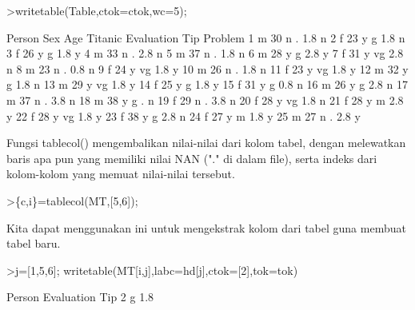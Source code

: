 \documentclass{article}
\newenvironment{eulernotebook}{\par}{\par}
\newenvironment{eulercomment}{\par\medskip}{\par\medskip}
\begin{document}
\begin{eulernotebook}
\begin{eulerprompt}
>writetable(Table,ctok=ctok,wc=5);
\end{eulerprompt}
\begin{euleroutput}
   Person  Sex  Age Titanic Evaluation  Tip Problem
        1    m   30       n          .  1.8       n
        2    f   23       y          g  1.8       n
        3    f   26       y          g  1.8       y
        4    m   33       n          .  2.8       n
        5    m   37       n          .  1.8       n
        6    m   28       y          g  2.8       y
        7    f   31       y         vg  2.8       n
        8    m   23       n          .  0.8       n
        9    f   24       y         vg  1.8       y
       10    m   26       n          .  1.8       n
       11    f   23       y         vg  1.8       y
       12    m   32       y          g  1.8       n
       13    m   29       y         vg  1.8       y
       14    f   25       y          g  1.8       y
       15    f   31       y          g  0.8       n
       16    m   26       y          g  2.8       n
       17    m   37       n          .  3.8       n
       18    m   38       y          g    .       n
       19    f   29       n          .  3.8       n
       20    f   28       y         vg  1.8       n
       21    f   28       y          m  2.8       y
       22    f   28       y         vg  1.8       y
       23    f   38       y          g  2.8       n
       24    f   27       y          m  1.8       y
       25    m   27       n          .  2.8       y
\end{euleroutput}
\begin{eulercomment}
Fungsi tablecol() mengembalikan nilai-nilai dari kolom tabel, dengan
melewatkan baris apa pun yang memiliki nilai NAN ("." di dalam file),
serta indeks dari kolom-kolom yang memuat nilai-nilai tersebut.
\end{eulercomment}
\begin{eulerprompt}
>\{c,i\}=tablecol(MT,[5,6]);
\end{eulerprompt}
\begin{eulercomment}
Kita dapat menggunakan ini untuk mengekstrak kolom dari tabel guna
membuat tabel baru.
\end{eulercomment}
\begin{eulerprompt}
>j=[1,5,6]; writetable(MT[i,j],labc=hd[j],ctok=[2],tok=tok)
\end{eulerprompt}
\begin{euleroutput}
      Person Evaluation       Tip
           2          g       1.8

\end{euleroutput}
\end{eulernotebook}
\end{document}
